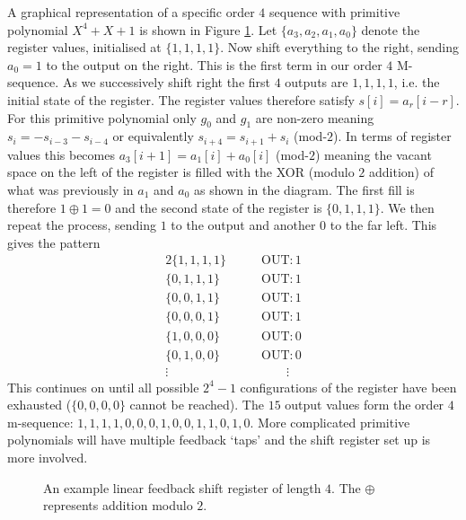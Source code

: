 \documentclass[twocolumn]{revtex4-2}
\begin{document}
A graphical representation of a specific order $4$ sequence with primitive polynomial $X^4+X+1$ is shown in Figure \ref{fig:shiftregister}. 
Let $\{a_3, a_2, a_1, a_0\}$ denote the register values, initialised at $\{1,1,1,1\}$. Now shift everything to the right, sending $a_0 = 1$ to the output on the right. 
This is the first term in our order $4$ M-sequence. As we successively shift right the first $4$ outputs are $1,1,1,1$, i.e. the initial state of the register. 
The register values therefore satisfy $s[i] = a_r[i-r]$. For this primitive polynomial only $g_0$ and $g_1$ are non-zero meaning $s_{i} = - s_{i-3} -  s_{i-4}$ or equivalently $s_{i+4} = s_{i+1} + s_{i}$ (mod-$2$). 
In terms of register values this becomes $a_3[i+1] = a_1[i] + a_0[i]$ (mod-$2$) meaning the vacant space on the left of the register is filled with the XOR (modulo $2$ addition) of what was previously in $a_1$ and $a_0$ as shown in the diagram.
The first fill is therefore $1 \oplus 1 = 0$ and the second state of the register is $\{0,1,1,1\}$. We then repeat the process, sending $1$ to the output and another $0$ to the far left. 
This gives the pattern
\begin{alignat*}{2}
    \{1,1,1,1\} &\qquad \text{OUT}: 1 \nonumber \\[0.1cm]
    \{0,1,1,1\} &\qquad \text{OUT}: 1 \nonumber \\[0.1cm]
    \{0,0,1,1\} &\qquad \text{OUT}: 1 \nonumber \\[0.1cm]
    \{0,0,0,1\} &\qquad \text{OUT}: 1 \nonumber \\[0.1cm]
    \{1,0,0,0\} &\qquad \text{OUT}: 0 \nonumber \\[0.1cm]
    \{0,1,0,0\} &\qquad \text{OUT}: 0 \nonumber \\[0.1cm]
    \vdots \qquad& \qquad \qquad \vdots \nonumber
\end{alignat*}
This continues on until all possible $2^4 - 1$ configurations of the register have been exhausted ($\{0,0,0,0\}$ cannot be reached). 
The $15$ output values form the order $4$ m-sequence: $1,1,1,1,0,0,0,1,0,0,1,1,0,1,0$.
More complicated primitive polynomials will have multiple feedback `taps' and the shift register set up is more involved.
\begin{figure}[t]
\caption{An example linear feedback shift register of length $4$. The $\oplus$ represents addition modulo $2$.}
\label{fig:shiftregister}
\end{figure}
\end{document}
